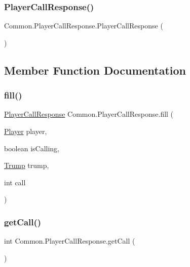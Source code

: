 \subsubsection{\texorpdfstring{Player\+Call\+Response()}{PlayerCallResponse()}}
{\footnotesize\ttfamily Common.\+Player\+Call\+Response.\+Player\+Call\+Response (\begin{DoxyParamCaption}{ }\end{DoxyParamCaption})\hspace{0.3cm}{\ttfamily [inline]}}



\subsection{Member Function Documentation}
\mbox{\label{classCommon_1_1PlayerCallResponse_a8273a7383a1b5c1bc459a1316b179709}} 
\subsubsection{\texorpdfstring{fill()}{fill()}}
{\footnotesize\ttfamily \mbox{\hyperlink{classCommon_1_1PlayerCallResponse}{Player\+Call\+Response}} Common.\+Player\+Call\+Response.\+fill (\begin{DoxyParamCaption}\item[{\mbox{\hyperlink{classCommon_1_1Player}{Player}}}]{player,  }\item[{boolean}]{is\+Calling,  }\item[{\mbox{\hyperlink{enumCommon_1_1Trump}{Trump}}}]{trump,  }\item[{int}]{call }\end{DoxyParamCaption})\hspace{0.3cm}{\ttfamily [inline]}}

\mbox{\label{classCommon_1_1PlayerCallResponse_a97d10694feeea69a03ca9942ec9fe005}} 
\subsubsection{\texorpdfstring{get\+Call()}{getCall()}}
{\footnotesize\ttfamily int Common.\+Player\+Call\+Response.\+get\+Call (\begin{DoxyParamCaption}{ }\end{DoxyParamCaption})\hspace{0.3cm}{\ttfamily [inline]}}

